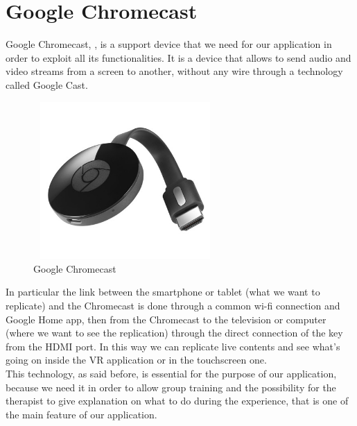 \section{Google Chromecast}
Google Chromecast, \cite{Chromecast}, is a support device that we need for our application in order to exploit all its functionalities. It is a device that allows to send audio and video streams from a screen to another, without any wire through a technology called Google Cast.
\begin{figure}[H]
\centering
\includegraphics[width=7cm, height=6cm]{immagini/chromecast.jpg}
\caption{Google Chromecast}\label{fig:chromecast}
\end{figure}
In particular the link between the smartphone or tablet (what we want to replicate) and the Chromecast is done through a common wi-fi connection and Google Home app, then from the Chromecast to the television or computer (where we want to see the replication) through the direct connection of the key from the HDMI port. In this way we can replicate live contents and see what's going on inside the VR application or in the touchscreen one. \cite{Jared} \\
This technology, as said before, is essential for the purpose of our application, because we need it in order to allow group training and the possibility for the therapist to give explanation on what to do during the experience, that is one of the main feature of our application. 


